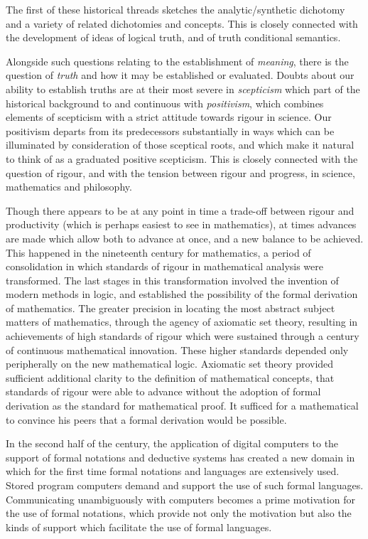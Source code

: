 The first of these historical threads sketches the analytic/synthetic
dichotomy and a variety of related dichotomies and concepts.
This is closely connected with the development of ideas of logical
truth, and of truth conditional semantics.

Alongside such questions relating to the establishment of
{\it meaning}, there is the question of {\it truth} and how it may
be established or evaluated.
Doubts about our ability to establish truths are at their most severe
in {\it scepticism} which part of the historical background to and
continuous with {\it positivism}, which combines elements of
scepticism with a strict attitude towards rigour in science.
Our positivism departs from its predecessors substantially in ways
which can be illuminated by consideration of those sceptical roots,
and which make it natural to think of as a graduated positive
scepticism.
This is closely connected with the question of rigour, and with the
tension between rigour and progress, in science, mathematics and
philosophy.

Though there appears to be at any point in time a trade-off between
rigour and productivity (which is perhaps easiest to see in
mathematics), at times advances are made which allow both to advance
at once, and a new balance to be achieved.
This happened in the nineteenth century for mathematics, a period of
consolidation in which standards of rigour in mathematical analysis
were transformed.
The last stages in this transformation involved the invention of
modern methods in logic, and established the possibility of the formal
derivation of mathematics.
The greater precision in locating the most abstract subject matters of
mathematics, through the agency of axiomatic set theory, resulting in
achievements of high standards of rigour which were sustained through
a century of continuous mathematical innovation.
These higher standards depended only peripherally on the new
mathematical logic.
Axiomatic set theory provided sufficient additional clarity to the
definition of mathematical concepts, that standards of rigour were
able to advance without the adoption of formal derivation as the
standard for mathematical proof.
It sufficed for a mathematical to convince his peers that a formal
derivation would be possible.

In the second half of the century, the application of digital
computers to the support of formal notations and deductive systems has
created a new domain in which for the first time formal notations and
languages are extensively used.
Stored program computers demand and support the use of such formal
languages.
Communicating unambiguously with computers becomes a prime motivation
for the use of formal notations, which provide not only the motivation
but also the kinds of support which facilitate the use of formal languages.

